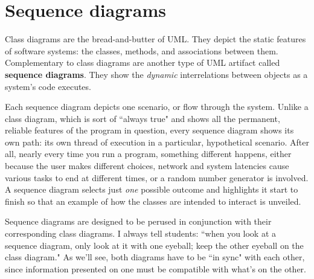 
\chapter{Sequence diagrams}

Class diagrams are the bread-and-butter of UML. They depict the static
features of software systems: the classes, methods, and associations between
them. Complementary to class diagrams are another type of UML artifact called
\textbf{sequence diagrams}. They show the \textit{dynamic} interrelations
between objects as a system's code executes.

Each sequence diagram depicts one scenario, or flow through the system. Unlike
a class diagram, which is sort of ``always true" and shows all the permanent,
reliable features of the program in question, every sequence diagram shows its
own path: its own thread of execution in a particular, hypothetical scenario.
After all, nearly every time you run a program, something different happens,
either because the user makes different choices, network and system latencies
cause various tasks to end at different times, or a random number generator is
involved. A sequence diagram selects just \textit{one} possible outcome and
highlights it start to finish so that an example of how the classes are
intended to interact is unveiled.

Sequence diagrams are designed to be perused in conjunction with their
corresponding class diagrams. I always tell students: ``when you look at a
sequence diagram, only look at it with one eyeball; keep the other eyeball on
the class diagram." As we'll see, both diagrams have to be ``in sync" with
each other, since information presented on one must be compatible with what's
on the other.
